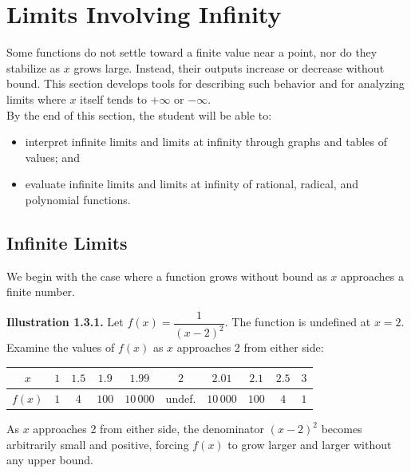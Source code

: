 
\section{Limits Involving Infinity}
\label{sec:1.3}

Some functions do not settle toward a finite value near a point, nor do they stabilize as \(x\) grows large. Instead, their outputs increase or decrease without bound. This section develops tools for describing such behavior and for analyzing limits where \(x\) itself tends to \(+\infty\) or \(-\infty\). \\

By the end of this section, the student will be able to:
\begin{itemize}
    \item interpret infinite limits and limits at infinity through graphs and tables of values; and
    \item evaluate infinite limits and limits at infinity of rational, radical, and polynomial functions.
\end{itemize}


\subsection*{Infinite Limits}
\label{subsec:1.3.1}


We begin with the case where a function grows without bound as \(x\) approaches a finite number.

\medskip
\textbf{Illustration 1.3.1.}
Let \(f(x) = \dfrac{1}{(x - 2)^{2}}\). The function is undefined at \(x = 2\). Examine the values of \(f(x)\) as \(x\) approaches 2 from either side:

\begin{center}
\small
\begin{tabular}{c|cccc|c|cccc}
\(x\)        & \(1\)  & \(1.5\) & \(1.9\) & \(1.99\) & \(2\) & \(2.01\) & \(2.1\) & \(2.5\) & \(3\) \\
\hline
\(f(x)\)     & \(1\)  & \(4\)   & \(100\) & \(10\,000\) & undef. & \(10\,000\) & \(100\) & \(4\) & \(1\)
\end{tabular}
\normalsize
\end{center}

As \(x\) approaches 2 from either side, the denominator \((x - 2)^{2}\) becomes arbitrarily small and positive, forcing \(f(x)\) to grow larger and larger without any upper bound.

